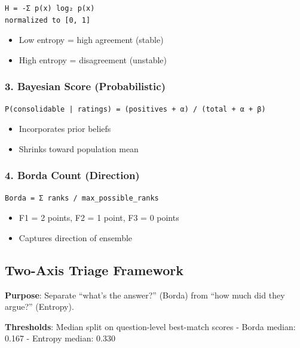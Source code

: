 \documentclass[
  letterpaper,
]{report}
\providecommand{\tightlist}{%
  \setlength{\itemsep}{0pt}\setlength{\parskip}{0pt}}
\begin{document}
\begin{verbatim}
H = -Σ p(x) log₂ p(x)
normalized to [0, 1]
\end{verbatim}

\begin{itemize}
\tightlist
\item
  Low entropy = high agreement (stable)
\item
  High entropy = disagreement (unstable)
\end{itemize}

\subsubsection{3. Bayesian Score
(Probabilistic)}\label{bayesian-score-probabilistic}

\begin{verbatim}
P(consolidable | ratings) = (positives + α) / (total + α + β)
\end{verbatim}

\begin{itemize}
\tightlist
\item
  Incorporates prior beliefs
\item
  Shrinks toward population mean
\end{itemize}

\subsubsection{4. Borda Count (Direction)}\label{borda-count-direction}

\begin{verbatim}
Borda = Σ ranks / max_possible_ranks
\end{verbatim}

\begin{itemize}
\tightlist
\item
  F1 = 2 points, F2 = 1 point, F3 = 0 points
\item
  Captures direction of ensemble
\end{itemize}

\subsection{Two-Axis Triage Framework}\label{two-axis-triage-framework}

\textbf{Purpose}: Separate ``what's the answer?'' (Borda) from ``how
much did they argue?'' (Entropy).

\textbf{Thresholds}: Median split on question-level best-match scores -
Borda median: 0.167 - Entropy median: 0.330
\end{document}
